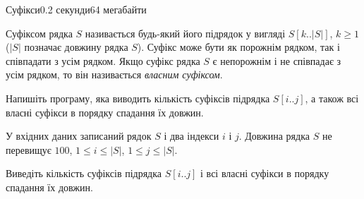 \begin{problem}{Суфікси}{}{}{0.2 секунди}{64 мегабайти}

Суфіксом рядка $S$ називається будь-який його підрядок у вигляді $S[k..|S|]$, $k \ge 1$ ($|S|$ позначає довжину рядка $S$). 
Суфікс може бути як порожнім рядком, так і співпадати з усім рядком.
Якщо суфікс рядка $S$ є непорожнім і не співпадає з усім рядком, то він називається {\it власним суфіксом}. 

Напишіть програму, яка виводить кількість суфіксів підрядка $S[i..j]$, а також 
всі власні суфікси в порядку спадання їх довжин.

\InputFile
У вхідних даних записаний рядок $S$ і два індекси $i$ і $j$. Довжина рядка $S$ не перевищує $100$, $1 \le i \le |S|$, $1 \le j \le |S|$.

\OutputFile
Виведіть кількість суфіксів підрядка $S[i..j]$
і всі власні суфікси в порядку спадання їх довжин.

\Examples

\begin{example}
%
%
\end{example}

\end{problem}

